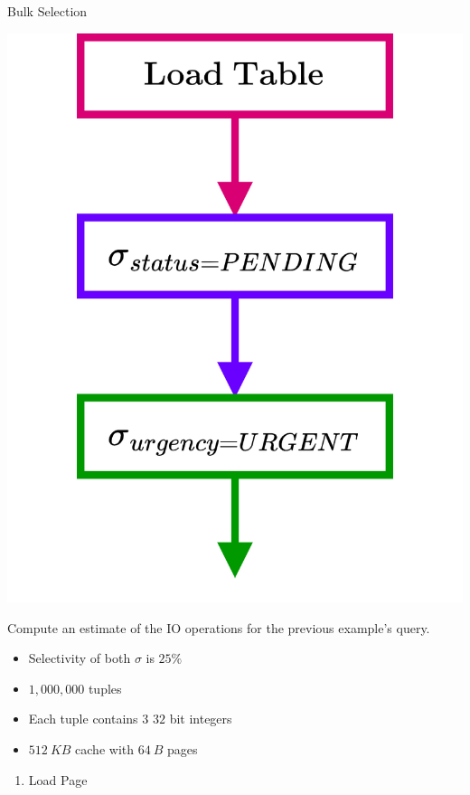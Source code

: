 \begin{examplebox}{Bulk Selection}
  \begin{minipage}{.2\textwidth}
    \includegraphics[width=\textwidth]{processing_models/images/example_bulk_processing.drawio.png}
  \end{minipage} \hfill \begin{minipage}{.79\textwidth}
    Compute an estimate of the IO operations for the previous example's query.
    \begin{itemize}
      \item Selectivity of both $\sigma$ is $25\%$
      \item $1,000,000$ tuples
      \item Each tuple contains $3$ $32$ bit integers
      \item $512 \ KB$ cache with $64 \ B$ pages
    \end{itemize}
  \end{minipage}
  \tcblower
  \begin{enumerate}
    \item { Load Page
}
\end{enumerate}
\end{examplebox}
